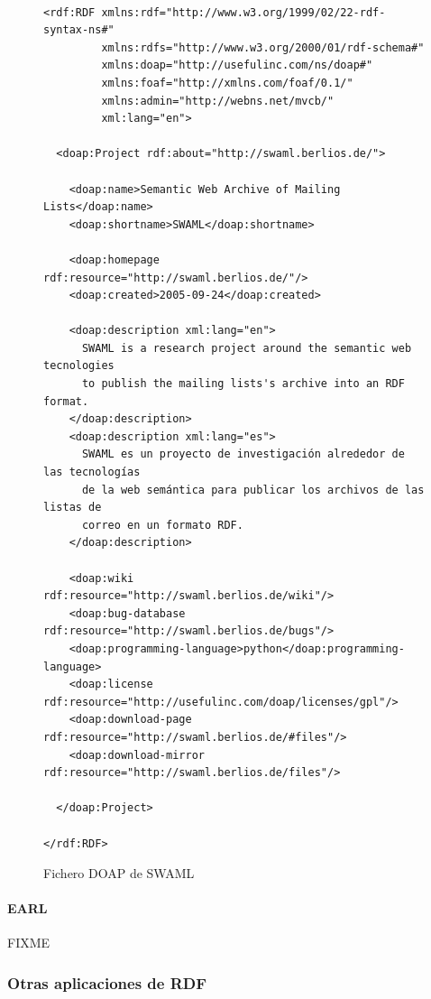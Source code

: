 \begin{figure}[p]
\begin{verbatim}

<rdf:RDF xmlns:rdf="http://www.w3.org/1999/02/22-rdf-syntax-ns#" 
         xmlns:rdfs="http://www.w3.org/2000/01/rdf-schema#" 
         xmlns:doap="http://usefulinc.com/ns/doap#" 
         xmlns:foaf="http://xmlns.com/foaf/0.1/" 
         xmlns:admin="http://webns.net/mvcb/" 
         xml:lang="en">

  <doap:Project rdf:about="http://swaml.berlios.de/">

    <doap:name>Semantic Web Archive of Mailing Lists</doap:name>
    <doap:shortname>SWAML</doap:shortname>

    <doap:homepage rdf:resource="http://swaml.berlios.de/"/>
    <doap:created>2005-09-24</doap:created>

    <doap:description xml:lang="en">
      SWAML is a research project around the semantic web tecnologies 
      to publish the mailing lists's archive into an RDF format.
    </doap:description>
    <doap:description xml:lang="es">
      SWAML es un proyecto de investigación alrededor de las tecnologías 
      de la web semántica para publicar los archivos de las listas de 
      correo en un formato RDF.
    </doap:description>

    <doap:wiki rdf:resource="http://swaml.berlios.de/wiki"/>
    <doap:bug-database rdf:resource="http://swaml.berlios.de/bugs"/>
    <doap:programming-language>python</doap:programming-language>
    <doap:license rdf:resource="http://usefulinc.com/doap/licenses/gpl"/>
    <doap:download-page rdf:resource="http://swaml.berlios.de/#files"/>
    <doap:download-mirror rdf:resource="http://swaml.berlios.de/files"/>

  </doap:Project>

</rdf:RDF>
\end{verbatim}
	\caption{Fichero DOAP de SWAML}
	\label{fig:ejemplo.doap}
\end{figure}

\paragraph{EARL}

FIXME

\subsubsection{Otras aplicaciones de RDF}

